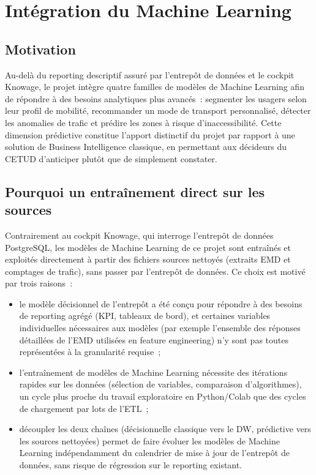 \chapter{Intégration du Machine Learning}
\label{ch:ml}

\section{Motivation}
Au-delà du reporting descriptif assuré par l'entrepôt de données et le cockpit Knowage, le projet intègre quatre familles de modèles de Machine Learning afin de répondre à des besoins analytiques plus avancés~: segmenter les usagers selon leur profil de mobilité, recommander un mode de transport personnalisé, détecter les anomalies de trafic et prédire les zones à risque d'inaccessibilité. Cette dimension prédictive constitue l'apport distinctif du projet par rapport à une solution de Business Intelligence classique, en permettant aux décideurs du CETUD d'anticiper plutôt que de simplement constater.

\section{Pourquoi un entraînement direct sur les sources}
Contrairement au cockpit Knowage, qui interroge l'entrepôt de données PostgreSQL, les modèles de Machine Learning de ce projet sont entraînés et exploités directement à partir des fichiers sources nettoyés (extraits EMD et comptages de trafic), sans passer par l'entrepôt de données. Ce choix est motivé par trois raisons~:

\begin{itemize}
\item le modèle décisionnel de l'entrepôt a été conçu pour répondre à des besoins de reporting agrégé (KPI, tableaux de bord), et certaines variables individuelles nécessaires aux modèles (par exemple l'ensemble des réponses détaillées de l'EMD utilisées en feature engineering) n'y sont pas toutes représentées à la granularité requise~;
\item l'entraînement de modèles de Machine Learning nécessite des itérations rapides sur les données (sélection de variables, comparaison d'algorithmes), un cycle plus proche du travail exploratoire en Python/Colab que des cycles de chargement par lots de l'ETL~;
\item découpler les deux chaînes (décisionnelle classique vers le DW, prédictive vers les sources nettoyées) permet de faire évoluer les modèles de Machine Learning indépendamment du calendrier de mise à jour de l'entrepôt de données, sans risque de régression sur le reporting existant.
\end{itemize}

